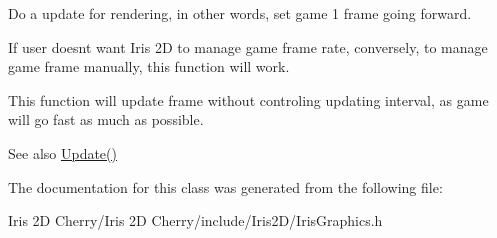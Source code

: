 Do a update for rendering, in other words, set game 1 frame going forward. 

If user doesn\textquotesingle{}t want Iris 2D to manage game frame rate, conversely, to manage game frame manually, this function will work.

This function will update frame without controling updating interval, as game will go fast as much as possible. \begin{DoxySeeAlso}{See also}
\hyperlink{class_iris2_d_1_1_iris_graphics_aa25debfc9a08d7084f48711a6bffdc4d}{Update()} 
\end{DoxySeeAlso}


The documentation for this class was generated from the following file\+:\begin{DoxyCompactItemize}
\item 
Iris 2\+D Cherry/\+Iris 2\+D Cherry/include/\+Iris2\+D/Iris\+Graphics.\+h\end{DoxyCompactItemize}
